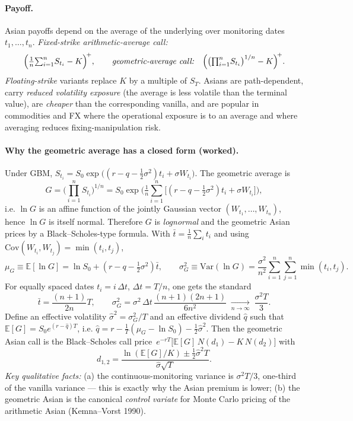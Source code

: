 \documentclass[11pt]{article}
\newcommand{\E}{\mathbb{E}}
\begin{document}
\paragraph{Payoff.} Asian payoffs depend on the average of the underlying over monitoring dates
$t_1,\dots,t_n$. \emph{Fixed-strike arithmetic-average call:}
\[
\Big(\tfrac1n{\textstyle\sum_{i=1}^n} S_{t_i}-K\Big)^{\!+},
\qquad
\text{\emph{geometric-average call:}}\quad
\Big(\big({\textstyle\prod_{i=1}^n} S_{t_i}\big)^{1/n}-K\Big)^{\!+}.
\]
\emph{Floating-strike} variants replace $K$ by a multiple of $S_T$. Asians are path-dependent, carry
\emph{reduced volatility exposure} (the average is less volatile than the terminal value), are
\emph{cheaper} than the corresponding vanilla, and are popular in commodities and FX where the
operational exposure is to an average and where averaging reduces fixing-manipulation risk.

\paragraph{Why the geometric average has a closed form (worked).}
Under GBM, $S_{t_i}=S_0\exp\!\big((r-q-\tfrac12\sigma^2)t_i+\sigma W_{t_i}\big)$. The geometric average is
\[
G=\Big({\textstyle\prod_{i=1}^n}S_{t_i}\Big)^{1/n}
=S_0\exp\!\Big(\tfrac1n{\textstyle\sum_{i=1}^n}\big[(r-q-\tfrac12\sigma^2)t_i+\sigma W_{t_i}\big]\Big),
\]
i.e. $\ln G$ is an affine function of the jointly Gaussian vector $(W_{t_1},\dots,W_{t_n})$, hence
$\ln G$ is itself normal. Therefore $G$ is \emph{lognormal} and the geometric Asian prices by a
Black--Scholes-type formula. With $\bar t=\frac1n\sum_i t_i$ and using $\mathrm{Cov}(W_{t_i},W_{t_j})=\min(t_i,t_j)$,
\[
\mu_G\equiv\E[\ln G]=\ln S_0+(r-q-\tfrac12\sigma^2)\bar t,
\qquad
\sigma_G^2\equiv\mathrm{Var}(\ln G)=\frac{\sigma^2}{n^2}\sum_{i=1}^n\sum_{j=1}^n\min(t_i,t_j).
\]
For equally spaced dates $t_i=i\,\Delta t$, $\Delta t=T/n$, one gets the standard
\[
\bar t=\frac{(n+1)}{2n}T,\qquad
\sigma_G^2=\sigma^2\,\Delta t\,\frac{(n+1)(2n+1)}{6n^2}
\;\xrightarrow[n\to\infty]{}\;\frac{\sigma^2 T}{3}.
\]
Define an effective volatility $\hat\sigma^2=\sigma_G^2/T$ and an effective dividend
$\hat q$ such that $\E[G]=S_0e^{(r-\hat q)T}$, i.e.
$\hat q=r-\tfrac1T(\mu_G-\ln S_0)-\tfrac12\hat\sigma^2$. Then the geometric Asian call is the
Black--Scholes call price $\,e^{-rT}\!\big[\E[G]\,N(d_1)-K\,N(d_2)\big]$ with
\[
d_{1,2}=\frac{\ln(\E[G]/K)\pm\tfrac12\hat\sigma^2 T}{\hat\sigma\sqrt T}.
\]
\emph{Key qualitative facts:} (a) the continuous-monitoring variance is $\sigma^2T/3$, one-third of the
vanilla variance --- this is exactly why the Asian premium is lower; (b) the geometric Asian is the
canonical \emph{control variate} for Monte Carlo pricing of the arithmetic Asian (Kemna--Vorst 1990).
\end{document}
